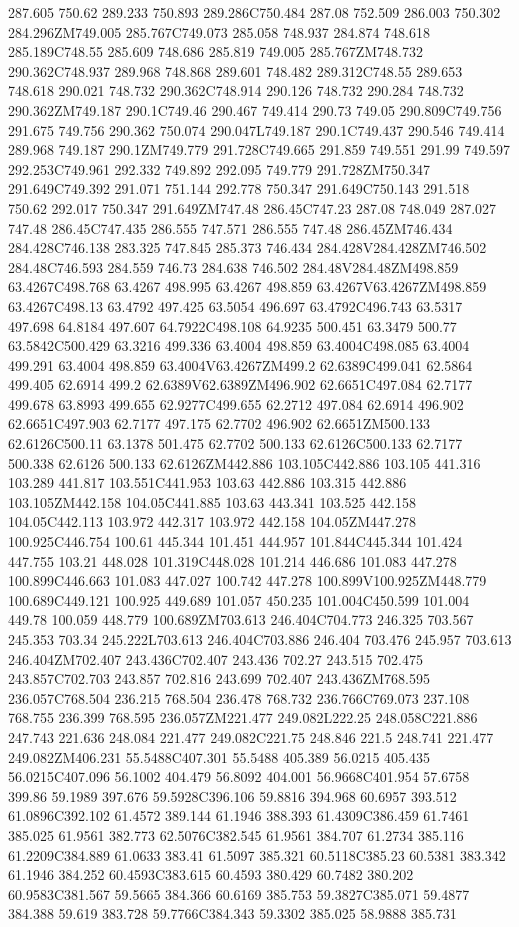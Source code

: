 287.605 750.62 289.233 750.893 289.286C750.484 287.08 752.509 286.003 750.302 284.296ZM749.005 285.767C749.073 285.058 748.937 284.874 748.618 285.189C748.55 285.609 748.686 285.819 749.005 285.767ZM748.732 290.362C748.937 289.968 748.868 289.601 748.482 289.312C748.55 289.653 748.618 290.021 748.732 290.362C748.914 290.126 748.732 290.284 748.732 290.362ZM749.187 290.1C749.46 290.467 749.414 290.73 749.05 290.809C749.756 291.675 749.756 290.362 750.074 290.047L749.187 290.1C749.437 290.546 749.414 289.968 749.187 290.1ZM749.779 291.728C749.665 291.859 749.551 291.99 749.597 292.253C749.961 292.332 749.892 292.095 749.779 291.728ZM750.347 291.649C749.392 291.071 751.144 292.778 750.347 291.649C750.143 291.518 750.62 292.017 750.347 291.649ZM747.48 286.45C747.23 287.08 748.049 287.027 747.48 286.45C747.435 286.555 747.571 286.555 747.48 286.45ZM746.434 284.428C746.138 283.325 747.845 285.373 746.434 284.428V284.428ZM746.502 284.48C746.593 284.559 746.73 284.638 746.502 284.48V284.48ZM498.859 63.4267C498.768 63.4267 498.995 63.4267 498.859 63.4267V63.4267ZM498.859 63.4267C498.13 63.4792 497.425 63.5054 496.697 63.4792C496.743 63.5317 497.698 64.8184 497.607 64.7922C498.108 64.9235 500.451 63.3479 500.77 63.5842C500.429 63.3216 499.336 63.4004 498.859 63.4004C498.085 63.4004 499.291 63.4004 498.859 63.4004V63.4267ZM499.2 62.6389C499.041 62.5864 499.405 62.6914 499.2 62.6389V62.6389ZM496.902 62.6651C497.084 62.7177 499.678 63.8993 499.655 62.9277C499.655 62.2712 497.084 62.6914 496.902 62.6651C497.903 62.7177 497.175 62.7702 496.902 62.6651ZM500.133 62.6126C500.11 63.1378 501.475 62.7702 500.133 62.6126C500.133 62.7177 500.338 62.6126 500.133 62.6126ZM442.886 103.105C442.886 103.105 441.316 103.289 441.817 103.551C441.953 103.63 442.886 103.315 442.886 103.105ZM442.158 104.05C441.885 103.63 443.341 103.525 442.158 104.05C442.113 103.972 442.317 103.972 442.158 104.05ZM447.278 100.925C446.754 100.61 445.344 101.451 444.957 101.844C445.344 101.424 447.755 103.21 448.028 101.319C448.028 101.214 446.686 101.083 447.278 100.899C446.663 101.083 447.027 100.742 447.278 100.899V100.925ZM448.779 100.689C449.121 100.925 449.689 101.057 450.235 101.004C450.599 101.004 449.78 100.059 448.779 100.689ZM703.613 246.404C704.773 246.325 703.567 245.353 703.34 245.222L703.613 246.404C703.886 246.404 703.476 245.957 703.613 246.404ZM702.407 243.436C702.407 243.436 702.27 243.515 702.475 243.857C702.703 243.857 702.816 243.699 702.407 243.436ZM768.595 236.057C768.504 236.215 768.504 236.478 768.732 236.766C769.073 237.108 768.755 236.399 768.595 236.057ZM221.477 249.082L222.25 248.058C221.886 247.743 221.636 248.084 221.477 249.082C221.75 248.846 221.5 248.741 221.477 249.082ZM406.231 55.5488C407.301 55.5488 405.389 56.0215 405.435 56.0215C407.096 56.1002 404.479 56.8092 404.001 56.9668C401.954 57.6758 399.86 59.1989 397.676 59.5928C396.106 59.8816 394.968 60.6957 393.512 61.0896C392.102 61.4572 389.144 61.1946 388.393 61.4309C386.459 61.7461 385.025 61.9561 382.773 62.5076C382.545 61.9561 384.707 61.2734 385.116 61.2209C384.889 61.0633 383.41 61.5097 385.321 60.5118C385.23 60.5381 383.342 61.1946 384.252 60.4593C383.615 60.4593 380.429 60.7482 380.202 60.9583C381.567 59.5665 384.366 60.6169 385.753 59.3827C385.071 59.4877 384.388 59.619 383.728 59.7766C384.343 59.3302 385.025 58.9888 385.731 
